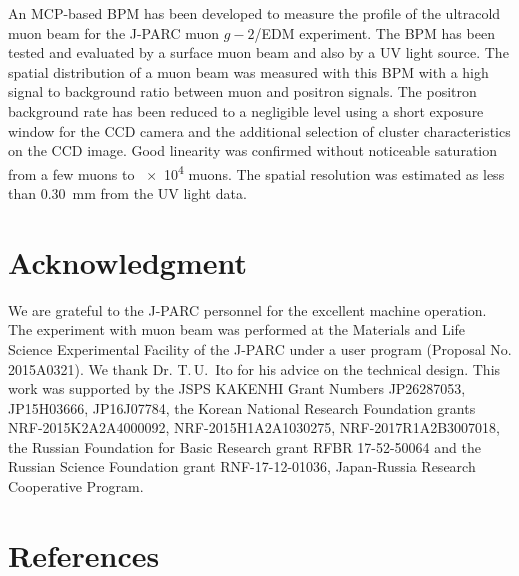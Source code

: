 \documentclass[preprint,3p,twocolumn]{elsarticle}
\begin{document}
An MCP-based BPM has been developed to measure the profile of the
ultracold muon beam for the J-PARC muon $g-2$/EDM experiment.
The BPM has been tested and evaluated by a surface muon beam and
also by a UV light source.  The spatial distribution of a muon
beam was measured with this
BPM with a high signal to background ratio between
muon and positron signals.  The positron background rate has been
reduced to a negligible level using a short exposure window for
the CCD camera and the additional selection of cluster
characteristics on the CCD image.  Good
linearity was confirmed without noticeable saturation from a few
muons to \num{e4} muons.  The spatial resolution was estimated as
less than \SI{.30}{\mm} from the UV light data.

\section*{Acknowledgment}

We are grateful to the J-PARC personnel for the excellent machine operation.
The experiment with muon beam was performed
at the Materials and Life Science Experimental Facility of the J-PARC 
under a user program (Proposal No. 2015A0321).
We thank Dr. T.\,U.~Ito for his advice on the technical design.
This work was supported by 
the JSPS KAKENHI Grant Numbers JP26287053, JP15H03666, JP16J07784,
the Korean National Research Foundation grants NRF-2015K2A2A4000092, NRF-2015H1A2A1030275, NRF-2017R1A2B3007018,
the Russian Foundation for Basic Research grant RFBR 17-52-50064 and
the Russian Science Foundation grant RNF-17-12-01036,
Japan-Russia Research Cooperative Program.

\section*{References}


\end{document}
